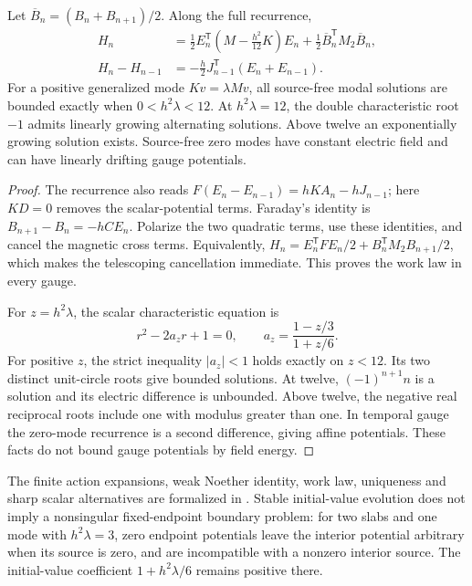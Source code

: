 \begin{theorem}
\label{thm:whitney-prism-stability}
Let \(\overline B_n=(B_n+B_{n+1})/2\). Along the full recurrence,
\begin{align*}
 H_n&=\frac12E_n^{\mathsf T}\left(M-\frac{h^2}{12}K\right)E_n
             +\frac12\overline B_n^{\mathsf T}M_2\overline B_n,\\
 H_n-H_{n-1}&=-\frac h2 J_{n-1}^{\mathsf T}(E_n+E_{n-1}).
\end{align*}
For a positive generalized mode \(Kv=\lambda Mv\), all source-free
modal solutions are bounded exactly when \(0<h^2\lambda<12\).
At \(h^2\lambda=12\), the double characteristic root \(-1\) admits
linearly growing alternating solutions. Above twelve an exponentially
growing solution exists. Source-free zero modes have constant electric field and can
have linearly drifting gauge potentials.
\end{theorem}

\begin{proof}
The recurrence also reads
\(F(E_n-E_{n-1})=hKA_n-hJ_{n-1}\); here \(KD=0\)
removes the scalar-potential terms. Faraday's identity is
\(B_{n+1}-B_n=-hCE_n\). Polarize the two quadratic terms, use these
identities, and cancel the magnetic cross terms. Equivalently,
\(H_n=E_n^{\mathsf T}FE_n/2+B_n^{\mathsf T}M_2B_{n+1}/2\),
which makes the telescoping cancellation immediate. This proves the work
law in every gauge.

For \(z=h^2\lambda\), the scalar characteristic equation is
\[
 r^2-2a_zr+1=0,\qquad a_z=\frac{1-z/3}{1+z/6}.
\]
For positive \(z\), the strict inequality \(|a_z|<1\) holds exactly
on \(z<12\). Its two distinct unit-circle roots give bounded solutions.
At twelve, \((-1)^{n+1}n\) is a solution and its electric difference is
unbounded. Above twelve, the negative real reciprocal roots include one
with modulus greater than one. In temporal gauge the zero-mode recurrence
is a second difference, giving affine potentials. These facts do not bound gauge
potentials by field energy.
\end{proof}

The finite action expansions, weak Noether identity, work law, uniqueness
and sharp scalar alternatives are formalized in
. Stable initial-value
evolution does not imply a nonsingular fixed-endpoint boundary problem:
for two slabs and one mode with \(h^2\lambda=3\), zero endpoint
potentials leave the interior potential arbitrary when its source is zero,
and are incompatible with a nonzero interior source. The initial-value
coefficient \(1+h^2\lambda/6\) remains positive there.

